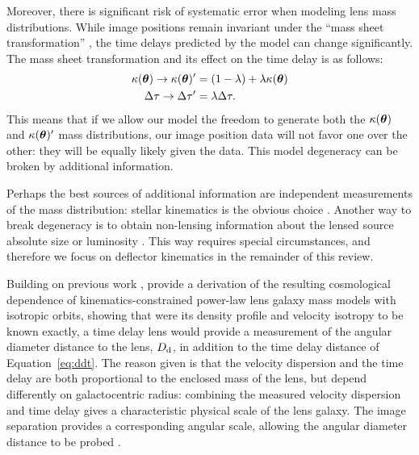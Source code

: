Moreover, there is significant risk of systematic error when modeling
lens mass distributions. While image positions remain invariant under
the ``mass sheet transformation'' \citep{FGS85,S+S13}
\citep[and its generalization, the source-position transformation][]{SPT}, the time delays
predicted by the model can change significantly. The mass sheet transformation
and its effect on the time delay is as follows:
%
\begin{align}
    \kappa(\boldsymbol{\theta}) \rightarrow \kappa(\boldsymbol{\theta})' &= (1 - \lambda) + \lambda \kappa(\boldsymbol{\theta})  \label{eq:mst} \\
    \Delta \tau \rightarrow \Delta \tau' &= \lambda \Delta \tau.
\end{align}
%
This means that if we allow our model the freedom to generate both the
$\kappa(\boldsymbol{\theta})$ and $\kappa(\boldsymbol{\theta})'$ mass distributions, our image position
data will not favor one over the other: they will be equally likely
given the data. This model degeneracy can be broken by additional
information.

Perhaps the best sources of additional information are independent
measurements of the mass distribution: stellar kinematics is the
obvious choice \citep{Koo++03}. 
Another way to break degeneracy is to obtain non-lensing information
about the lensed source absolute size \citep{SBL11} or luminosity
\citep{K+B98,Hol01}. This way requires special circumstances, and therefore
we focus on deflector kinematics in the remainder of this review.

Building on previous work \citep{GLB08,P+J9},
\citet{JeeKomatsuSuyu2015} provide a derivation of the resulting
cosmological dependence of kinematics-constrained power-law lens
galaxy mass models with isotropic orbits, showing that were its
density profile and velocity isotropy to be known exactly, a time
delay lens would provide a measurement of the angular diameter
distance to the lens, $D_{\rm d}$, in addition to the time delay distance of
Equation~\ref{eq:ddt}. The reason given is that the velocity
dispersion and the time delay are both proportional to the enclosed
mass of the lens, but depend differently on galactocentric radius:
combining the measured velocity dispersion and time delay gives a
characteristic physical scale of the lens galaxy.  The image
separation provides a corresponding angular scale, allowing the
angular diameter distance to be probed \citep[see earlier work
by][]{GLB08}.

